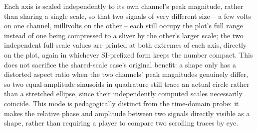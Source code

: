 Each axis is scaled independently to its own channel's peak magnitude, rather than sharing a
single scale, so that two signals of very different size -- a few volts on one channel,
millivolts on the other -- each still occupy the plot's full range instead of one being
compressed to a sliver by the other's larger scale; the two independent full-scale values are
printed at both extremes of each axis, directly on the plot, again in whichever SI-prefixed
form keeps the number compact. This does not sacrifice the shared-scale
case's original benefit: a shape only has a distorted aspect ratio when the two channels'
peak magnitudes genuinely differ, so two equal-amplitude sinusoids in quadrature still trace
an actual circle rather than a stretched ellipse, since their independently computed scales
necessarily coincide. This mode is pedagogically distinct from the time-domain probe: it
makes the relative phase and amplitude between two signals directly visible as a shape,
rather than requiring a player to compare two scrolling traces by eye.
